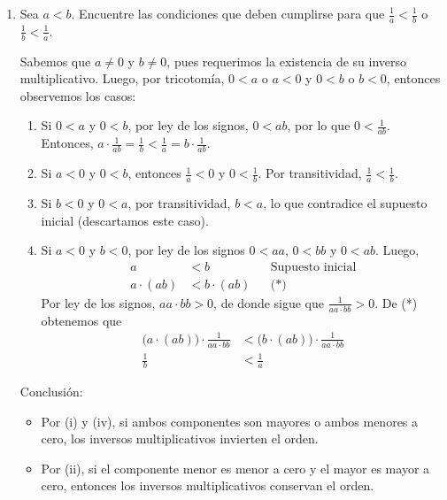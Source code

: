 \documentclass[11pt]{article}
\begin{document}
\begin{enumerate}[label=\alph*)]
 \item Sea $a<b$. Encuentre las condiciones que deben cumplirse para que $\frac{1}{a}<\frac{1}{b}$ o $\frac{1}{b}<\frac{1}{a}$.
 
 Sabemos que $a\neq 0$ y $b\neq 0$, pues requerimos la existencia de su inverso multiplicativo. Luego, por tricotomía, $0<a$ o $a<0$ y $0<b$ o $b<0$, entonces observemos los casos: \begin{enumerate}[label=\roman*)]
  \item Si $0<a$ y $0<b$, por ley de los signos, $0<ab$, por lo que $0<\frac{1}{ab}$. Entonces, $a\cdot \frac{1}{ab} = \frac{1}{b} < \frac{1}{a} = b \cdot \frac{1}{ab}$.
  \item Si $a<0$ y $0<b$, entonces $\frac{1}{a}<0$ y $0<\frac{1}{b}$. Por transitividad, $\frac{1}{a}<\frac{1}{b}$.
  \item Si $b<0$ y $0<a$, por transitividad, $b<a$, lo que contradice el supuesto inicial (descartamos este caso).
  \item Si $a<0$ y $b<0$, por ley de los signos $0<a a$, $0<b b$ y $0<ab$. Luego,\begin{align*}
   a &< b && \text{Supuesto inicial}\\
   a \cdot (ab) &< b \cdot (ab) && \text{(*)}
  \end{align*} Por ley de los signos, $aa\cdot bb>0$, de donde sigue que $\frac{1}{aa\cdot bb}>0$. De (*) obtenemos que \begin{align*}
   \bigl(a \cdot (ab)\bigr) \cdot \frac{1}{aa\cdot bb} &< \bigl(b \cdot (ab)\bigr)\cdot \frac{1}{aa\cdot bb}\\
   \frac{1}{b} &< \frac{1}{a}
  \end{align*}
 \end{enumerate}
 Conclusión: \begin{itemize}
  \item Por (i) y (iv), si ambos componentes son mayores o ambos menores a cero, los inversos multiplicativos invierten el orden.%
  \item Por (ii), si el componente menor es menor a cero y el mayor es mayor a cero, entonces los inversos multiplicativos conservan el orden.
 \end{itemize}

\end{enumerate}
\end{document}
